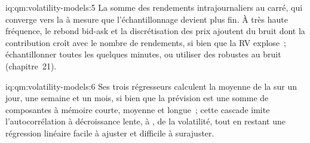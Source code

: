 \begin{solution}{iq:qm:volatility-models:5}
La somme des rendements intrajournaliers au carré, qui converge vers la  à mesure que l'échantillonnage devient plus fin. À très haute fréquence, le rebond bid-ask et la
discrétisation des prix ajoutent du bruit dont la contribution croît avec le nombre de rendements, si bien que la RV explose~; échantillonner toutes les quelques minutes, ou utiliser des  robustes au bruit
(chapitre~21).
\end{solution}

\begin{solution}{iq:qm:volatility-models:6}
Ses trois régresseurs calculent la moyenne de la  sur un jour, une semaine et un mois, si bien que la prévision est une somme de composantes à mémoire courte, moyenne et longue~; cette
cascade imite l'autocorrélation à décroissance lente, à , de la volatilité, tout en restant une régression linéaire facile à ajuster et difficile à surajuster.
\end{solution}

